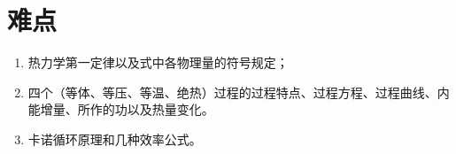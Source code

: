 \documentclass{ctexbook}
\begin{document}
\section{难点}

\begin{enumerate}
    \item 热力学第一定律以及式中各物理量的符号规定；
    \item 四个（等体、等压、等温、绝热）过程的过程特点、过程方程、过程曲线、内能增量、所作的功以及热量变化。
    \item 卡诺循环原理和几种效率公式。
\end{enumerate}


\end{document}

